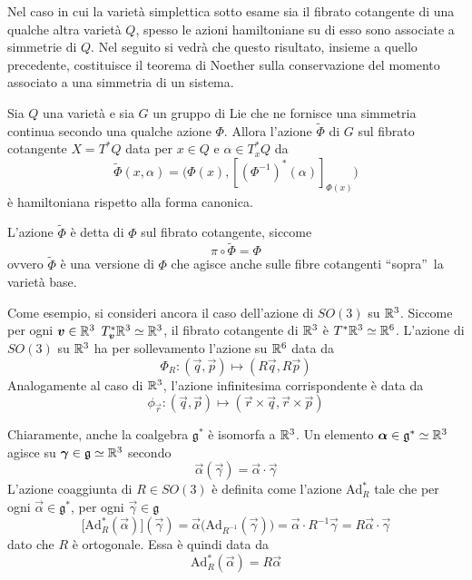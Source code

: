 Nel caso in cui la varietà simplettica sotto esame sia il fibrato cotangente di una qualche altra varietà $Q$, spesso le azioni hamiltoniane su di esso sono associate a simmetrie di $Q$. Nel seguito si vedrà che questo risultato, insieme a quello precedente, costituisce il teorema di Noether sulla conservazione del momento associato a una simmetria di un sistema.
\begin{theorem}
  Sia $Q$ una varietà e sia $G$ un gruppo di Lie che ne fornisce una simmetria continua secondo una qualche azione $\Phi$. Allora l'azione $\tilde{\Phi}$ di $G$ sul fibrato cotangente $X=T^*Q$ data per $x \in Q$ e $\alpha \in T^*_x Q$ da
  \begin{equation*}
  \tilde{\Phi}(x,\alpha) = \big(\Phi(x), [(\Phi^{-1})^*(\alpha)]_{\Phi(x)}\big)
  \end{equation*} 
  è hamiltoniana rispetto alla forma canonica.
\end{theorem}
\begin{remark}
  L'azione $\tilde{\Phi}$ è detta  di $\Phi$ sul fibrato cotangente, siccome \begin{equation*}
  \pi \circ \tilde{\Phi} = \Phi
  \end{equation*}
  ovvero $\tilde{\Phi}$ è una versione di $\Phi$ che agisce anche sulle fibre cotangenti \textquotedblleft sopra\textquotedblright\ la varietà base.
\end{remark}

Come esempio, si consideri ancora il caso dell'azione di $SO(3)$ su $\mathbb{R}^3$. Siccome per ogni $\boldsymbol{v} \in  \mathbb{R}^3$ $T^*_{\boldsymbol{v}}\mathbb{R}^3 \simeq \mathbb{R}^3$, il fibrato cotangente di $\mathbb{R}^3$ è $T^*\mathbb{R}^3 \simeq \mathbb{R}^6$. L'azione di $SO(3)$ su $\mathbb{R}^3$ ha per sollevamento l'azione su $\mathbb{R}^6$ data da 
\begin{equation*}
\Phi_R: (\vec{q},\vec{p}) \mapsto (R\vec{q},R\vec{p})
\end{equation*}  
Analogamente al caso di $\mathbb{R}^3$, l'azione infinitesima corrispondente è data da
\begin{equation*}
\phi_{\vec{r}}: (\vec{q},\vec{p}) \mapsto (\vec{r}\times \vec{q},\vec{r}\times \vec{p})
\end{equation*}

Chiaramente, anche la coalgebra $\mathfrak{g}^*$ è isomorfa a $\mathbb{R}^3$. Un elemento $\boldsymbol{\alpha} \in \mathfrak{g}^* \simeq \mathbb{R}^3$ agisce su $\boldsymbol{\gamma} \in \mathfrak{g} \simeq \mathbb{R}^3$ secondo
\begin{equation*}
\vec{\alpha}(\vec{\gamma}) = \vec{\alpha} \cdot \vec{\gamma}
\end{equation*} 
L'azione coaggiunta di $R \in SO(3)$ è definita come l'azione $\mathrm{Ad}^*_R$ tale che per ogni $\vec{\alpha} \in \mathfrak{g}^*$, per ogni $\vec{\gamma} \in \mathfrak{g}$
\begin{equation*}
  \big[\mathrm{Ad}^*_R(\vec{\alpha})\big](\vec{\gamma}) = \vec{\alpha}\big(\mathrm{Ad}_{R^{-1}}(\vec{\gamma})\big) = \vec{\alpha} \cdot R^{-1}\vec{\gamma} = R \vec{\alpha} \cdot \vec{\gamma}
\end{equation*} 
dato che $R$ è ortogonale. Essa è quindi data da
\begin{equation*}
\mathrm{Ad}^*_R(\vec{\alpha}) = R\vec{\alpha}
\end{equation*} 

